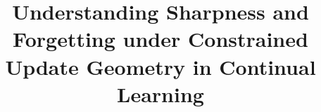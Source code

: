 \documentclass{article}
\begin{document}
\theoremstyle{plain}
\newtheorem{theorem}{Theorem}[section]
\newtheorem{proposition}[theorem]{Proposition}
\newtheorem{lemma}[theorem]{Lemma}
\newtheorem{corollary}[theorem]{Corollary}
\theoremstyle{definition}
\newtheorem{definition}[theorem]{Definition}
\newtheorem{assumption}[theorem]{Assumption}
\theoremstyle{remark}
\newtheorem{remark}[theorem]{Remark}

\title{
Understanding Sharpness and Forgetting under Constrained Update Geometry in Continual Learning
}
\maketitle
\end{document}
